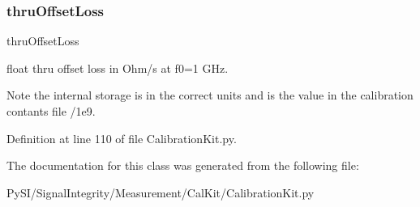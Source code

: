 \subsubsection{\texorpdfstring{thru\+Offset\+Loss}{thruOffsetLoss}}
{\footnotesize\ttfamily thru\+Offset\+Loss}



float thru offset loss in Ohm/s at f0=1 G\+Hz. 

\begin{DoxyNote}{Note}
the internal storage is in the correct units and is the value in the calibration contants file /1e9. 
\end{DoxyNote}


Definition at line 110 of file Calibration\+Kit.\+py.



The documentation for this class was generated from the following file\+:\begin{DoxyCompactItemize}
\item 
Py\+S\+I/\+Signal\+Integrity/\+Measurement/\+Cal\+Kit/Calibration\+Kit.\+py\end{DoxyCompactItemize}
